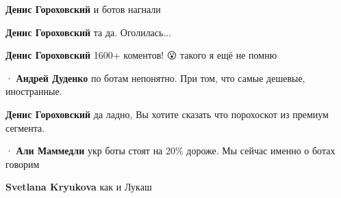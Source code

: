 \begin{itemize}
\begin{itemize}
\textbf{Денис Гороховский} и ботов нагнали

 
\textbf{Денис Гороховский} та да. Оголилась...

 
\textbf{Денис Гороховский} 1600+ коментов! 😮 такого я ещё не помню 🤔

 
  · 
\textbf{Андрей Дуденко} по ботам непонятно. При том, что самые дешевые, иностранные.

 
\textbf{Денис Гороховский} да ладно, Вы хотите сказать что порохоскот из премиум сегмента.

 
  · 
\textbf{Али Маммедли} укр боты стоят на 20\% дороже. Мы сейчас именно о ботах говорим

 
\textbf{Svetlana Kryukova} как и Лукаш

 

\end{itemize}
\end{itemize}
